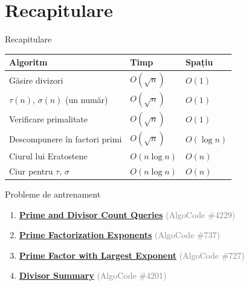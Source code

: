 \documentclass[10pt]{beamer}
\begin{document}
\section{Recapitulare}

\begin{frame}{Recapitulare}
  \begin{center}
  \begin{tabular}{lll}
    \toprule
    Algoritm & Timp & Spațiu \\
    \midrule
    Găsire divizori                   & $O(\sqrt{n})$ & $O(1)$ \\
    $\tau(n)$, $\sigma(n)$ (un număr) & $O(\sqrt{n})$ & $O(1)$ \\
    Verificare primalitate            & $O(\sqrt{n})$ & $O(1)$ \\
    Descompunere în factori primi     & $O(\sqrt{n})$ & $O(\log n)$ \\
    Ciurul lui Eratostene             & $O(n \log n)$ & $O(n)$ \\
    Ciur pentru $\tau$, $\sigma$      & $O(n \log n)$ & $O(n)$ \\
    \bottomrule
  \end{tabular}
  \end{center}
\end{frame}

\begin{frame}{Probleme de antrenament}
  \begin{enumerate}
    \item \href{https://code.algolymp.com/problems/4229}{\textbf{Prime and Divisor Count Queries}}
          \textcolor{gray}{(AlgoCode \#4229)}
    \item \href{https://code.algolymp.com/problems/737}{\textbf{Prime Factorization Exponents}}
          \textcolor{gray}{(AlgoCode \#737)}
    \item \href{https://code.algolymp.com/problems/727}{\textbf{Prime Factor with Largest Exponent}}
          \textcolor{gray}{(AlgoCode \#727)}
    \item \href{https://code.algolymp.com/problems/4201}{\textbf{Divisor Summary}}
          \textcolor{gray}{(AlgoCode \#4201)}
  \end{enumerate}
\end{frame}
\end{document}
